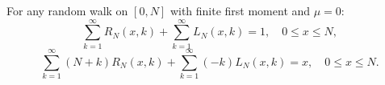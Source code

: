 For any random walk on \([0,N]\) with finite first moment and \(\mu = 0\):
\[
\sum_{k=1}^{\infty} R_N(x,k) + \sum_{k=1}^{\infty} L_N(x,k) = 1, \quad 0 \leq x \leq N,
\]
\[
\sum_{k=1}^{\infty} (N+k) R_N(x,k) + \sum_{k=1}^{\infty} (-k) L_N(x,k) = x, \quad 0 \leq x \leq N.
\]
